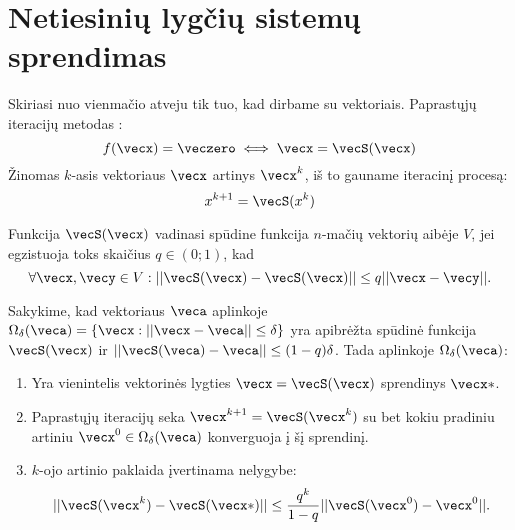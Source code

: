 \section{Netiesinių lygčių sistemų sprendimas}





Skiriasi nuo vienmačio atveju tik tuo, kad dirbame su vektoriais.
Paprastųjų iteracijų metodas :
\begin{equation*}
  f(\vecx) = \veczero \iff \vecx = \vecS(\vecx)
\end{equation*}
Žinomas $k$-asis vektoriaus $\vecx$ artinys $\vecx^{k}$, iš to gauname
iteracinį procesą:
\begin{equation*}
  x^{k+1} = \vecS(x^{k})
\end{equation*}


\begin{defn}
  Funkcija $\vecS(\vecx)$ vadinasi spūdine funkcija $n$-mačių vektorių
  aibėje $V$, jei egzistuoja toks skaičius $q \in \left( 0; 1 \right)$, kad
  \begin{equation*}
    \forall \vecx, \vecy \in V :
      ||\vecS(\vecx) - \vecS(\vecx)|| \leq q||\vecx - \vecy||.
  \end{equation*}
\end{defn}




\begin{prop}
  Sakykime, kad vektoriaus $\veca$ aplinkoje
  $\Omega_{\delta}(\veca) = \left\{ \vecx :
    || \vecx - \veca || \leq \delta \right\}$
  yra apibrėžta spūdinė funkcija $\vecS(\vecx)$ ir
  $||\vecS(\veca) - \veca|| \leq (1 - q)\delta$.
  Tada aplinkoje $\Omega_{\delta}(\veca)$:
  \begin{enumerate}
    \item Yra vienintelis vektorinės lygties $\vecx = \vecS(\vecx)$ sprendinys
      $\vecx*$.
    \item Paprastųjų iteracijų seka $\vecx^{k+1} = \vecS(\vecx^{k})$ su bet
      kokiu pradiniu artiniu $\vecx^{0} \in \Omega_{\delta}(\veca)$ konverguoja
      į šį sprendinį.
    \item $k$-ojo artinio paklaida įvertinama nelygybe:
      \begin{equation*}
        ||\vecS(\vecx^{k}) - \vecS(\vecx*)||
          \leq \frac{q^{k}}{1-q}||\vecS(\vecx^{0}) - \vecx^{0}||.
      \end{equation*}
  \end{enumerate}
\end{prop}


